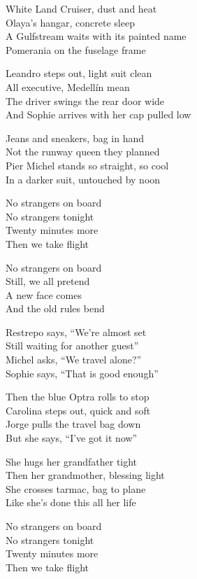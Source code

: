 \begin{lyrics}
White Land Cruiser, dust and heat\\
Olaya’s hangar, concrete sleep\\
A Gulfstream waits with its painted name\\
Pomerania on the fuselage frame

Leandro steps out, light suit clean\\
All executive, Medellín mean\\
The driver swings the rear door wide\\
And Sophie arrives with her cap pulled low

Jeans and sneakers, bag in hand\\
Not the runway queen they planned\\
Pier Michel stands so straight, so cool\\
In a darker suit, untouched by noon

No strangers on board\\
No strangers tonight\\
Twenty minutes more\\
Then we take flight

No strangers on board\\
Still, we all pretend\\
A new face comes\\
And the old rules bend

Restrepo says, “We’re almost set\\
Still waiting for another guest”\\
Michel asks, “We travel alone?”\\
Sophie says, “That is good enough”

Then the blue Optra rolls to stop\\
Carolina steps out, quick and soft\\
Jorge pulls the travel bag down\\
But she says, “I’ve got it now”

She hugs her grandfather tight\\
Then her grandmother, blessing light\\
She crosses tarmac, bag to plane\\
Like she’s done this all her life

No strangers on board\\
No strangers tonight\\
Twenty minutes more\\
Then we take flight


\end{lyrics}
